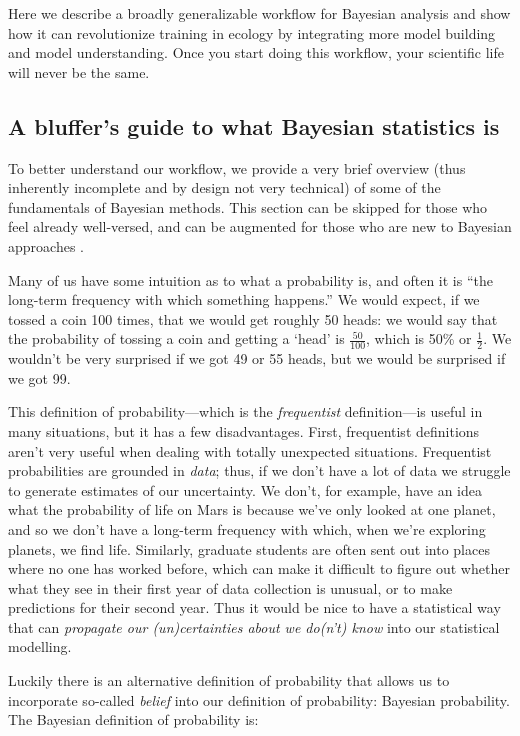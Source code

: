 \documentclass[11pt]{article}
\begin{document}
{Here we describe a broadly generalizable workflow for Bayesian analysis and show how it can revolutionize training in ecology by integrating more model building and model understanding. Once you start doing this workflow, your scientific life will never be the same. 

\subsection{A bluffer's guide to what Bayesian statistics is}
To better understand our workflow, we provide a very brief overview (thus inherently incomplete and by design not very technical) of some of the fundamentals of Bayesian methods. This section can be skipped for those who feel already well-versed, and can be augmented for those who are new to Bayesian approaches \citep[see, for example,][]{statrethink,BDA,regotherstories}.

Many of us have some intuition as to what a probability is, and often it is ``the long-term frequency with which something happens.'' We would expect, if we tossed a coin 100 times, that we would get roughly 50 heads: we would say that the probability of tossing a coin and getting a `head' is $\frac{50}{100}$, which is 50\% or $\frac{1}{2}$. We wouldn't be very surprised if we got 49 or 55 heads, but we would be surprised if we got 99.

This definition of probability---which is the \emph{frequentist} definition---is useful in many situations, but it has a few disadvantages. First, frequentist definitions aren't very useful when dealing with totally unexpected situations. Frequentist probabilities are grounded in \emph{data}; thus, if we don't have a lot of data we struggle to generate estimates of our uncertainty. We don't, for example, have an idea what the probability of life on Mars is because we've only looked at one planet, and so we don't have a long-term frequency with which, when we're exploring planets, we find life. Similarly, graduate students are often sent out into places where no one has worked before, which can make it difficult to figure out whether what they see in their first year of data collection is unusual, or to make predictions for their second year. Thus it would be nice to have a statistical way that can \emph{propagate our (un)certainties about we do(n't) know} into our statistical modelling.

Luckily there is an alternative definition of probability that allows us to incorporate so-called \emph{belief} into our definition of probability: Bayesian probability. The Bayesian definition of probability is:

}
\end{document}
